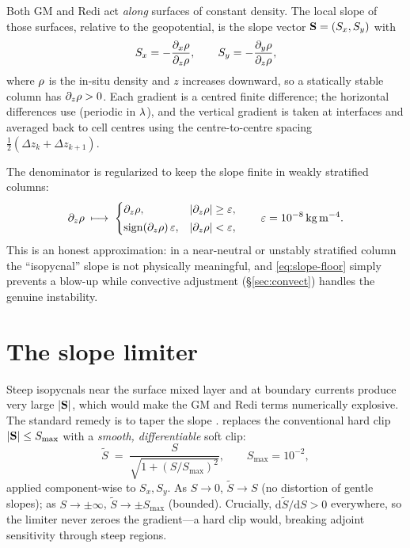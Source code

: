 Both GM and Redi act \emph{along} surfaces of constant density. The local slope of
those surfaces, relative to the geopotential, is the slope vector
$\mathbf{S} = (S_x, S_y)$ with
\begin{equation}
S_x = -\frac{\partial_x \rho}{\partial_z \rho}, \qquad
S_y = -\frac{\partial_y \rho}{\partial_z \rho},
\label{eq:slope}
\end{equation}
where $\rho$ is the in-situ density and $z$ increases downward, so a statically
stable column has $\partial_z\rho>0$. Each gradient is a centred finite
difference; the horizontal differences use  (periodic in $\lambda$),
and the vertical gradient is taken at interfaces and averaged back to cell centres
using the centre-to-centre spacing $\tfrac12(\Delta z_k + \Delta z_{k+1})$.

The denominator is regularized to keep the slope finite in weakly stratified
columns:
\begin{equation}
\partial_z\rho \;\longmapsto\;
\begin{cases}
\partial_z\rho, & |\partial_z\rho| \ge \varepsilon,\\[2pt]
\operatorname{sign}(\partial_z\rho)\,\varepsilon, & |\partial_z\rho| < \varepsilon,
\end{cases}
\qquad \varepsilon = 10^{-8}\,\mathrm{kg\,m^{-4}}.
\label{eq:slope-floor}
\end{equation}
This is an honest approximation: in a near-neutral or unstably stratified column
the ``isopycnal'' slope is not physically meaningful, and \eqref{eq:slope-floor}
simply prevents a blow-up while convective adjustment (\S\ref{sec:convect}) handles
the genuine instability.

\section{The slope limiter}

Steep isopycnals near the surface mixed layer and at boundary currents produce very
large $|\mathbf{S}|$, which would make the GM and Redi terms numerically explosive.
The standard remedy is to taper the slope \citep{danabasoglu1995,large1997}. \model{} replaces the conventional hard
clip $|\mathbf{S}|\le S_{\max}$ with a \emph{smooth, differentiable} soft clip:
\begin{equation}
\widetilde{S} \;=\; \frac{S}{\sqrt{1 + (S/S_{\max})^2}},
\qquad S_{\max} = 10^{-2},
\label{eq:limiter}
\end{equation}
applied component-wise to $S_x,S_y$. As $S\to0$, $\widetilde S\to S$ (no distortion
of gentle slopes); as $S\to\pm\infty$, $\widetilde S\to \pm S_{\max}$ (bounded). Crucially,
$\mathrm{d}\widetilde S/\mathrm{d}S>0$ everywhere, so the limiter never zeroes the
gradient---a hard clip would, breaking adjoint sensitivity through steep regions.

